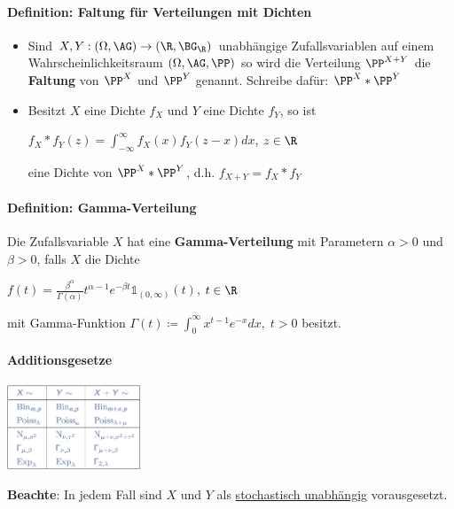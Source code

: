 \paragraph{Definition: Faltung für Verteilungen mit Dichten}
\begin{itemize}
	\item Sind $X,Y:(\Omega,\AG)\rightarrow(\R,\BG_\R)$ unabhängige Zufallsvariablen auf einem Wahrscheinlichkeitsraum $(\Omega,\AG,\PP)$ so wird die Verteilung $\PP^{X+Y}$ die \textbf{Faltung} von $\PP^X$ und $\PP^Y$ genannt.
	Schreibe dafür: $\PP^X*\PP^Y$
	\item Besitzt $X$ eine Dichte $f_X$ und $Y$ eine Dichte $f_Y$, so ist
	\begin{tightcenter}
		 $f_X*f_Y(z)=\int_{-\infty}^{\infty}f_X(x)f_Y(z-x)dx$, \qquad$z\in\R$
	\end{tightcenter}
	eine Dichte von $\PP^X*\PP^Y$, d.h. $f_{X+Y}=f_X*f_Y$
\end{itemize}

\paragraph{Definition: Gamma-Verteilung}
Die Zufallsvariable $X$ hat eine \textbf{Gamma-Verteilung} mit Parametern $\alpha>0$ und $\beta>0$, falls $X$ die Dichte
\begin{tightcenter}
	$f(t)=\frac{\beta^\alpha}{\Gamma(\alpha)}t^{\alpha-1}e^{-\beta t}\mathds{1}_{(0,\infty)}(t)$, \qquad$t\in\R$
\end{tightcenter}
mit Gamma-Funktion $\Gamma(t)\coloneqq\int_{0}^{\infty}x^{t-1}e^{-x}dx,\;t>0$ besitzt.

\paragraph{Additionsgesetze}
\begin{center}
	\includegraphics[width=0.3\textwidth]{images/image3.png}
\end{center}
\textbf{Beachte}: In jedem Fall sind $X$ und $Y$ als \underline{stochastisch unabhängig} vorausgesetzt.

